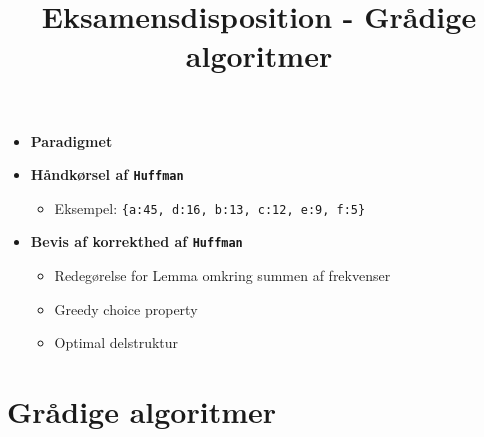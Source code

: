 
\title{Eksamensdisposition - Grådige algoritmer}

\maketitle



\begin{itemize}
	\item \textbf{Paradigmet}
	\item \textbf{Håndkørsel af \texttt{Huffman}}
	\begin{itemize}
		\item Eksempel: \verb|{a:45, d:16, b:13, c:12, e:9, f:5}|
	\end{itemize}
	\item \textbf{Bevis af korrekthed af \texttt{Huffman}}
	\begin{itemize}
		\item Redegørelse for Lemma omkring summen af frekvenser
		\item Greedy choice property
		\item Optimal delstruktur
	\end{itemize}
\end{itemize}




\newpage
\section{Grådige algoritmer}





